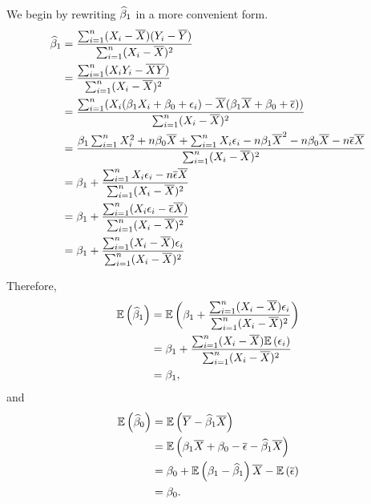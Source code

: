 \begin{ex}
  We begin by rewriting $\widehat{\beta}_1$ in a more convenient form.
  \begin{align*}
    \widehat{\beta}_1
     & =\frac{\sum_{i=1}^n(X_i-\overline{X})(Y_i-\overline{Y})}{\sum_{i=1}^n(X_i-\overline{X})^2}               \\
     & =\frac{\sum_{i=1}^n(X_iY_i-\overline{X}\overline{Y})}{\sum_{i=1}^n(X_i-\overline{X})^2}                  \\
     & =\frac{\sum_{i=1}^n(X_i(\beta_1X_i+\beta_0+\epsilon_i)
      -\overline{X}(\beta_1\overline{X}+\beta_0+\overline{\epsilon}))}{\sum_{i=1}^n(X_i-\overline{X})^2}                    \\
     & =\frac{\beta_1\sum_{i=1}^nX_i^2+n\beta_0\overline{X}+\sum_{i=1}^n X_i\epsilon_i
      -n\beta_1\overline{X}^2-n\beta_0\overline{X}-n\overline{\epsilon}\overline{X}}{\sum_{i=1}^n(X_i-\overline{X})^2}             \\
     & =\beta_1+\frac{\sum_{i=1}^nX_i\epsilon_i-n\overline{\epsilon}\overline{X}}{\sum_{i=1}^n(X_i-\overline{X})^2}  \\
     & =\beta_1+\frac{\sum_{i=1}^n(X_i\epsilon_i-\overline{\epsilon}\overline{X})}{\sum_{i=1}^n(X_i-\overline{X})^2} \\
     & =\beta_1+\frac{\sum_{i=1}^n(X_i-\overline{X})\epsilon_i}{\sum_{i=1}^n(X_i-\overline{X})^2}
  \end{align*}

  Therefore,
  \begin{align*}
    \mathbb{E}\left(\widehat{\beta}_1\right)
     & =\mathbb{E}\left(\beta_1+\frac{\sum_{i=1}^n(X_i-\overline{X})\epsilon_i}{\sum_{i=1}^n(X_i-\overline{X})^2}\right) \\
     & =\beta_1+\frac{\sum_{i=1}^n(X_i-\overline{X})\mathbb{E}\left(\epsilon_i\right)}{\sum_{i=1}^n(X_i-\overline{X})^2} \\
     & =\beta_1,
  \end{align*}
  and
  \begin{align*}
    \mathbb{E}\left(\widehat{\beta}_0\right)
     & =\mathbb{E}\left(\overline{Y}-\widehat{\beta}_1\overline{X}\right)                        \\
     & =\mathbb{E}\left(\beta_1\overline{X}+\beta_0-\overline{\epsilon}-\widehat{\beta}_1\overline{X}\right) \\
     & =\beta_0+\mathbb{E}\left(\beta_1-\widehat{\beta}_1\right)\overline{X}-\mathbb{E}\left(\overline{\epsilon}\right)  \\
     & =\beta_0.
  \end{align*}


\end{ex}
